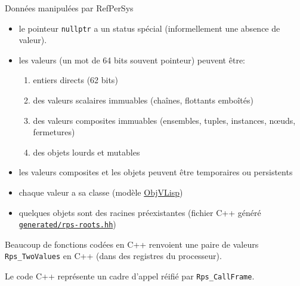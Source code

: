 \documentclass[final,a4,xcolor={svgnames,dvipsnames}]{beamer}
\begin{document}
 \begin{frame}{Données manipulées par RefPerSys}

   \begin{itemize}
   \item le pointeur \texttt{nullptr} a un status spécial (informellement une absence de valeur).
   \item les valeurs (un mot de 64 bits souvent pointeur) peuvent être:
     \begin{enumerate}
     \item entiers directs (62 bits)
     \item des valeurs scalaires immuables (chaînes, flottants emboîtés)
     \item des valeurs composites immuables (ensembles, tuples,
       instances, n{\oe}uds, fermetures)
       \item des objets lourds et mutables
     \end{enumerate}
     \item les valeurs composites et les objets peuvent être
       temporaires ou persistents
       \item chaque valeur a sa classe (modèle
         \href{https://en.wikipedia.org/wiki/ObjVlisp}{ObjVLisp})
       \item quelques objets sont des racines préexistantes (fichier
         C++ généré \href{https://github.com/RefPerSys/RefPerSys/blob/master/generated/rps-roots.hh}{\texttt{generated/rps-roots.hh}})
   \end{itemize}

   Beaucoup de fonctions codées en C++ renvoient une paire de valeurs
   \texttt{Rps\_TwoValues} en C++ (dans des registres du processeur).

   Le code C++ représente un cadre d'appel réifié par
   \texttt{Rps\_CallFrame}.
 \end{frame}
 
\end{document}
